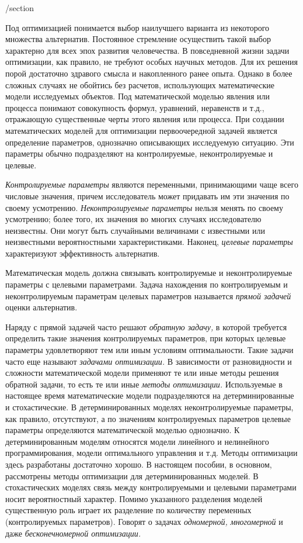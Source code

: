 /section

	Под оптимизацией понимается выбор наилучшего варианта из некоторого множества альтернатив. Постоянное стремление осуществить такой выбор характерно для всех эпох развития человечества. В повседневной жизни задачи оптимизации, как правило, не требуют особых научных методов. Для их решения порой достаточно здравого смысла и накопленного ранее опыта. Однако в более сложных случаях не обойтись без расчетов, использующих математические модели исследуемых объектов. Под математической моделью явления или процесса понимают совокупность формул, уравнений, неравенств и т.д., отражающую существенные черты этого явления или процесса. При создании математических моделей для оптимизации первоочередной задачей является определение параметров, однозначно описывающих исследуемую ситуацию. Эти параметры обычно подразделяют на контролируемые, неконтролируемые и целевые.


	\textit{Контролируемые параметры}  являются переменными, принимающими чаще всего числовые значения, причем исследователь может придавать им эти значения по своему усмотрению. 
\textit{Неконтролируемые параметры}  нельзя менять по своему усмотрению; более того, их значения во многих случаях исследователю неизвестны. Они могут быть случайными величинами с известными или неизвестными вероятностными характеристиками. Наконец, \textit{целевые параметры} характеризуют эффективность альтернатив.

	Математическая модель должна связывать контролируемые и неконтролируемые параметры с целевыми параметрами. Задача нахождения по контролируемым и  неконтролируемым параметрам целевых параметров называется \textit{прямой задачей} оценки альтернатив.

	Наряду с прямой задачей часто решают \textit{обратную задачу,} в которой требуется определить такие значения контролируемых параметров, при которых целевые параметры  удовлетворяют тем или иным условиям оптимальности. Такие задачи часто  еще называют \textit{задачами оптимизации.} В зависимости от разновидности и сложности математической модели применяют те или иные методы решения обратной задачи, то есть те или иные \textit{методы оптимизации.} Используемые в настоящее время математические модели подразделяются на детерминированные и стохастические. В детерминированных моделях неконтролируемые параметры, как правило, отсутствуют, а по значениям контролируемых параметров целевые параметры определяются математической моделью однозначно. К детерминированным моделям относятся модели линейного и нелинейного программирования, модели оптимального управления и т.д. Методы оптимизации здесь разработаны достаточно хорошо. В настоящем пособии, в основном, рассмотрены методы оптимизации для детерминированных моделей. В стохастических моделях связь между контролируемыми и целевыми параметрами носит вероятностный характер. Помимо указанного разделения моделей существенную роль играет их разделение по количеству переменных (контролируемых параметров). Говорят о задачах \textit{одномерной, многомерной} и даже \textit{бесконечномерной оптимизации.}

